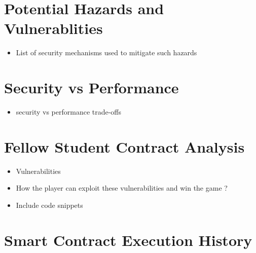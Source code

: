 \documentclass[12pt,a4paper]{article}
\begin{document}
\section*{Potential Hazards and Vulnerablities}
\begin{itemize}
        \item List of security mechanisms used to mitigate such hazards
\end{itemize}

\section*{Security vs Performance}
\begin{itemize}
        \item security vs performance trade-offs
\end{itemize}

\section*{Fellow Student Contract Analysis}
\begin{itemize}
        \item Vulnerabilities
        \item How the player can exploit these vulnerabilities and win the game ?
        \item Include code snippets
\end{itemize}

\section*{Smart Contract Execution History}
\end{document}
